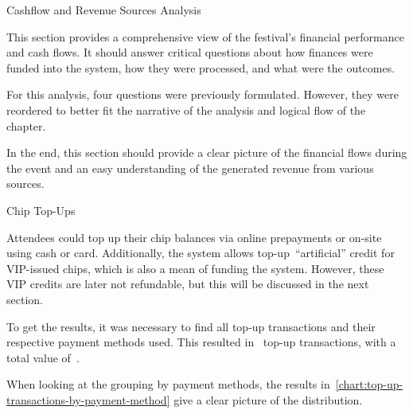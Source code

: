 \begin{section}{Cashflow and Revenue Sources Analysis}
	\label{sec:analysis-cashflow-and-revenue-sources}

	This section provides a comprehensive view of the festival's financial performance and cash flows.
	It should answer critical questions about how finances were funded into the system, how they were processed, and what were the outcomes.

	For this analysis, four questions were previously formulated.
	However, they were reordered to better fit the narrative of the analysis and logical flow of the chapter.

	In the end, this section should provide a clear picture of the financial flows during the event and an easy understanding of the generated revenue from various sources.

	\begin{subsection}{Chip Top-Ups}
		\label{subsec:analysis-chip-top-up}


		Attendees could top up their chip balances via online prepayments or on-site using cash or card.
		Additionally, the system allows top-up~\enquote{artificial} credit for VIP-issued chips, which is also a mean of funding the system.
		However, these VIP credits are later not refundable, but this will be discussed in the next section.

		To get the results, it was necessary to find all top-up transactions and their respective payment methods used.
		This resulted in ~top-up transactions, with a total value of~.

		When looking at the grouping by payment methods, the results in~\autoref{chart:top-up-transactions-by-payment-method} give a clear picture of the distribution.


\end{subsection}
\end{section}
